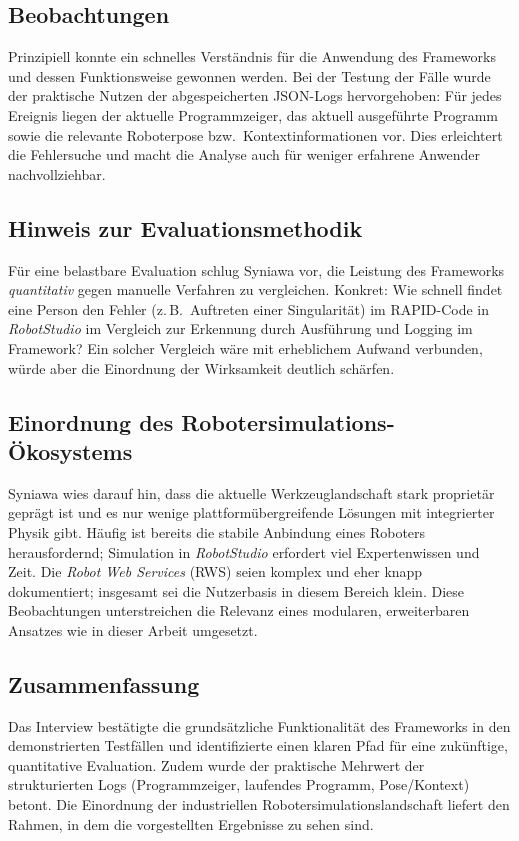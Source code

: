 \subsection{Beobachtungen}

Prinzipiell konnte ein schnelles Verständnis für die Anwendung des Frameworks
und dessen Funktionsweise gewonnen werden. Bei der Testung der Fälle wurde der
praktische Nutzen der abgespeicherten JSON-Logs hervorgehoben: Für jedes
Ereignis liegen der aktuelle Programmzeiger, das aktuell ausgeführte Programm
sowie die relevante Roboterpose bzw.\ Kontextinformationen vor. Dies erleichtert
die Fehlersuche und macht die Analyse auch für weniger erfahrene Anwender
nachvollziehbar.

\subsection{Hinweis zur Evaluationsmethodik}

Für eine belastbare Evaluation schlug Syniawa vor, die Leistung des Frameworks
\emph{quantitativ} gegen manuelle Verfahren zu vergleichen. Konkret: Wie schnell
findet eine Person den Fehler (z.\,B.\ Auftreten einer Singularität) im
RAPID-Code in \emph{RobotStudio} im Vergleich zur Erkennung durch Ausführung und
Logging im Framework? Ein solcher Vergleich wäre mit erheblichem Aufwand
verbunden, würde aber die Einordnung der Wirksamkeit deutlich schärfen.

\subsection{Einordnung des Robotersimulations-Ökosystems}

Syniawa wies darauf hin, dass die aktuelle Werkzeuglandschaft stark proprietär
geprägt ist und es nur wenige plattformübergreifende Lösungen mit integrierter
Physik gibt. Häufig ist bereits die stabile Anbindung eines Roboters
herausfordernd; Simulation in \emph{RobotStudio} erfordert viel Expertenwissen
und Zeit. Die \emph{Robot Web Services} (RWS) seien komplex und eher knapp
dokumentiert; insgesamt sei die Nutzerbasis in diesem Bereich klein. Diese
Beobachtungen unterstreichen die Relevanz eines modularen, erweiterbaren
Ansatzes wie in dieser Arbeit umgesetzt.

\subsection{Zusammenfassung}

Das Interview bestätigte die grundsätzliche
Funktionalität des Frameworks in den demonstrierten Testfällen und
identifizierte einen klaren Pfad für eine zukünftige, quantitative Evaluation.
Zudem wurde der praktische Mehrwert der strukturierten Logs (Programmzeiger,
laufendes Programm, Pose/Kontext) betont. Die Einordnung der industriellen
Robotersimulationslandschaft liefert den Rahmen, in dem die
vorgestellten Ergebnisse zu
sehen sind.

